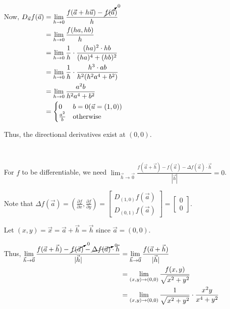 \documentclass[11pt,fleqn]{book} %
\begin{document}
Now, 
$\begin{aligned}[t]
    D_{\vec{u}} f(\vec{a}) & = \lim_{h\to0} \frac{f(\vec{a} + h\vec{u}) - \cancelto{0}{f(\vec{a}})}{h} \\
                           & = \lim_{h\to0} \frac{f(ha, hb)}{h}                                        \\
                           & = \lim_{h\to0} \frac{1}{h} \cdot \frac{(ha)^2 \cdot hb}{(ha)^4 + (hb)^2}  \\
                           & = \lim_{h\to0} \frac{1}{h} \cdot \frac{h^3 \cdot ab}{h^2(h^2a^4 + b^2)}   \\
                           & = \lim_{h\to0} \frac{a^2b}{h^2a^4 + b^2}                                  \\
                           & = \begin{cases}
                                   0             & b = 0 (\vec{u} = (1,0)) \\
                                   \frac{a^2}{b} & \text{otherwise}
                               \end{cases}
\end{aligned}$

Thus, the directional derivatives exist at $(0,0)$. 

{~~~}

For $f$ to be differentiable, we need $\lim_{\vec{h}\to\vec{0}} \frac{f(\vec{a} + \vec{h}) - f(\vec{a}) - \Delta f(\vec{a}) \cdot \vec{h}}{| \vec{h} |} = 0$. 

Note that $\Delta f(\vec{a}) = \left( \frac{\partial f}{\partial x}, \frac{\partial f}{\partial y} \right) = \begin{bmatrix} D_{(1,0)} f(\vec{a}) \\ D_{(0,1)} f(\vec{a}) \end{bmatrix} = \begin{bmatrix} 0 \\ 0 \end{bmatrix}$.

Let $(x,y) = \vec{x} = \vec{a} + \vec{h} = \vec{h}$ since $\vec{a} = (0,0)$. 

Thus, 
$\begin{aligned}[t]
    \lim_{\vec{h}\to\vec{0}} \frac{f(\vec{a} + \vec{h}) - \cancelto{0}{f(\vec{a})} - \cancelto{0}{\Delta f(\vec{a})} \cdot \vec{h}}{| \vec{h} |}
     & = \lim_{\vec{h}\to\vec{0}} \frac{f(\vec{a} + \vec{h})}{| \vec{h} |}          \\
     & = \lim_{(x,y)\to(0,0)} \frac{f(x,y)}{\sqrt{x^2 + y^2}}                       \\
     & = \lim_{(x,y)\to(0,0)} \frac{1}{\sqrt{x^2+y^2}} \cdot \frac{x^2y}{x^4 + y^2} 
\end{aligned}$
\end{document}
